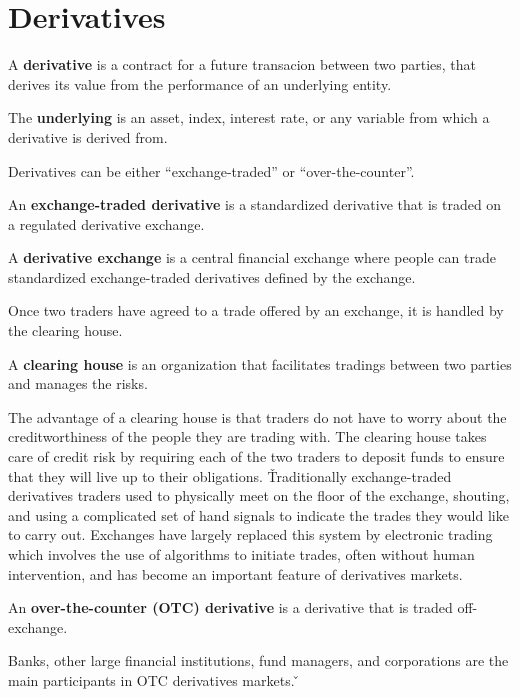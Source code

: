 \section{Derivatives}

\bd[Derivative]
A \textbf{derivative} is a contract for a future transacion between two parties, that derives its value from the
performance of an underlying entity.
\ed

\bd[Underlying]
The \textbf{underlying} is an asset, index, interest rate, or any variable from which a derivative is derived from.
\ed

Derivatives can be either ``exchange-traded'' or ``over-the-counter''.

An \textbf{exchange-traded derivative} is a standardized derivative that is traded on a regulated derivative exchange.
\ed

A \textbf{derivative exchange} is a central financial exchange where people can trade standardized exchange-traded
derivatives defined by the exchange.
\ed

Once two traders have agreed to a trade offered by an exchange, it is handled by the clearing house.

A \textbf{clearing house} is an organization that facilitates tradings between two parties and manages the risks.
\ed

The advantage of a clearing house is that traders do not have to worry about the creditworthiness of the people they
are trading with. The clearing house takes care of credit risk by requiring each of the two traders to deposit funds
to ensure that they will live up to their obligations. \v

Traditionally exchange-traded derivatives traders used to physically meet on the floor of the exchange, shouting, and
using a complicated set of hand signals to indicate the trades they would like to carry out. Exchanges have largely
replaced this system by electronic trading which involves the use of algorithms to initiate trades, often without human
intervention, and has become an important feature of derivatives markets.

An \textbf{over-the-counter (OTC) derivative} is a derivative that is traded off-exchange.
\ed

Banks, other large financial institutions, fund managers, and corporations are the main participants in OTC derivatives
markets. \v

